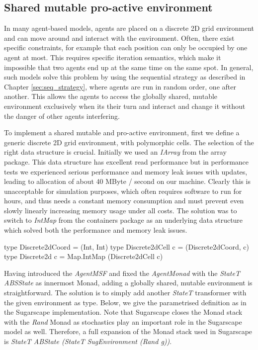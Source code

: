\subsection{Shared mutable pro-active environment}
In many agent-based models, agents are placed on a discrete 2D grid environment and can move around and interact with the environment. Often, there exist specific constraints, for example that each position can only be occupied by one agent at most. This requires specific iteration semantics, which make it impossible that two agents end up at the same time on the same spot. In general, such models solve this problem by using the sequential strategy as described in Chapter \ref{sec:seq_strategy}, where agents are run in random order, one after another. This allows the agents to access the globally shared, mutable environment exclusively when its their turn and interact and change it without the danger of other agents interfering.

To implement a shared mutable and pro-active environment, first we define a generic discrete 2D grid environment, with polymorphic cells. The selection of the right data structure is crucial. Initially we used an \textit{IArray} from the array package. This data structure has excellent read performance but in performance tests we experienced serious performance and memory leak issues with updates, leading to allocation of about 40 MByte / second on our machine. Clearly this is unacceptable for simulation purposes, which often requires software to run for hours, and thus needs a constant memory consumption and must prevent even slowly linearly increasing memory usage under all costs. The solution was to switch to \textit{IntMap} from the containers package as an underlying data structure which solved both the performance and memory leak issues.

\begin{HaskellCode}
type Discrete2dCoord  = (Int, Int)
type Discrete2dCell c = (Discrete2dCoord, c)
type Discrete2d c     = Map.IntMap (Discrete2dCell c)
\end{HaskellCode}

Having introduced the \textit{AgentMSF} and fixed the \textit{AgentMonad} with the \textit{StateT ABSState} as innermost Monad, adding a globally shared, mutable environment is straightforward. The solution is to simply add another \textit{StateT} transformer with the given environment as type. Below, we give the parametrised definition as in the Sugarscape implementation. Note that Sugarscape closes the Monad stack with the \textit{Rand} Monad as stochastics play an important role in the Sugarscape model as well. Therefore, a full expansion of the Monad stack used in Sugarscape is  \textit{StateT ABState (StateT SugEnvironment (Rand g))}.

